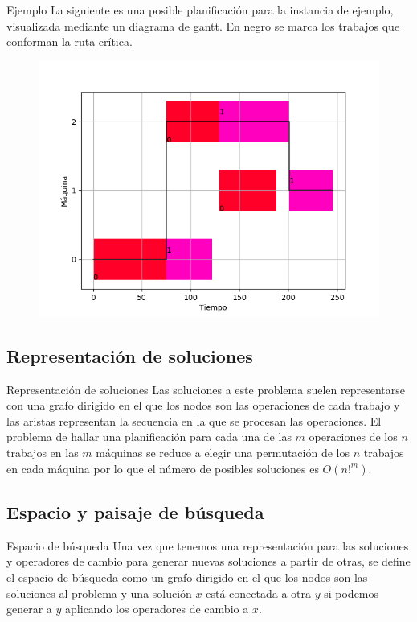 \documentclass[11pt]{beamer}
\begin{document}
\begin{frame}{Ejemplo}
La siguiente es una posible planificación para la instancia de ejemplo, visualizada mediante un diagrama de gantt. En negro se marca los trabajos que conforman la ruta crítica. 
\begin{figure}[H]
\includegraphics[scale=.5]{planejemplorc.png}
\end{figure}
\end{frame}
\subsection*{Representación de soluciones}
\begin{frame}{Representación de soluciones}
Las soluciones a este problema suelen representarse con una grafo dirigido en el que los nodos son las operaciones de cada trabajo y las aristas representan la secuencia en la que se procesan las operaciones.
El problema de hallar una planificación para cada una de las $m$ operaciones de los $n$ trabajos en las $m$ máquinas se reduce a elegir una permutación de los $n$ trabajos en cada máquina por lo que el número de posibles soluciones es $O(n!^m)$.
\end{frame}
\subsection*{Espacio y paisaje de búsqueda}
\begin{frame}{Espacio de búsqueda}
Una vez que tenemos una representación para las soluciones y operadores de cambio para generar nuevas soluciones a partir de otras, se define el espacio de búsqueda como un grafo dirigido en el que los nodos son las soluciones al problema y una solución $x$ está conectada a otra $y$ si podemos generar a $y$ aplicando los operadores de cambio a $x$.\\
\end{frame}
\end{document}
